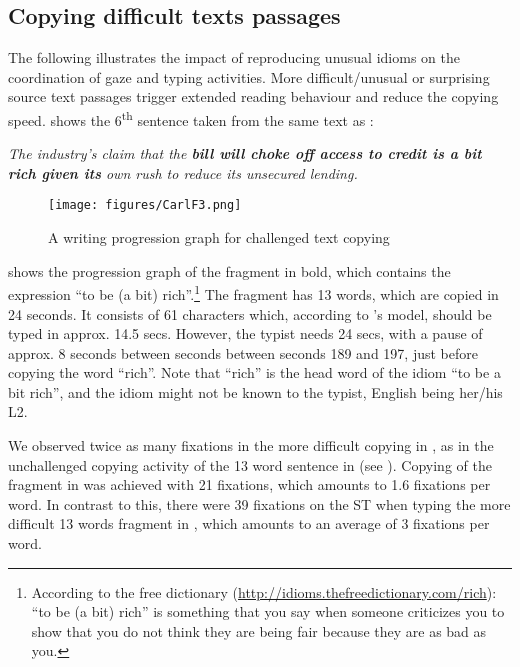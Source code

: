 \documentclass[output=paper]{LSP/langsci}
\begin{document}
\subsection{Copying difficult texts passages}\label{sec:carl:3.3}

The following  illustrates the impact of reproducing unusual idioms on the coordination of gaze and typing activities. More difficult/unusual or surprising source text passages trigger extended reading behaviour and reduce the copying speed.  shows the 6\textsuperscript{th} sentence taken from the same text as :

\ea\label{ex:carl:2}
\textit{The industry's claim that the \textbf{bill will choke off access to credit is a bit rich given its} own rush to reduce its unsecured lending.}
\z

\begin{figure}
\texttt{[image: figures/CarlF3.png]}
\caption{A writing progression graph for challenged text copying}
\label{fig:carl:3}
\end{figure}

 shows the progression graph of the fragment in bold, which contains the expression ``to be (a bit) rich''.\footnote{According to the free dictionary (\url{http://idioms.thefreedictionary.com/rich}): ``to be (a bit) rich'' is something that you say when someone criticizes you to show that you do not think they are being fair because they are as bad as you.} The fragment has 13 words, which are copied in 24 seconds. It consists of 61 characters which, according to \citeauthor{John1996}'s model, should be typed in approx. 14.5 secs. However, the typist needs 24 secs, with a pause of approx. 8 seconds between seconds between seconds 189 and 197, just before copying the word ``rich''. Note that ``rich'' is the head word of the idiom ``to be a bit rich'', and the idiom might not be known to the typist, English being her/his L2. 

We observed twice as many fixations in the more difficult copying in , as in the unchallenged copying activity of the 13 word sentence in  (see ).  Copying of the fragment in  was achieved with 21 fixations, which amounts to 1.6 fixations per word. In contrast to this, there were 39 fixations on the ST when typing the more difficult 13 words fragment in , which amounts to an average of 3 fixations per word.
\end{document}
